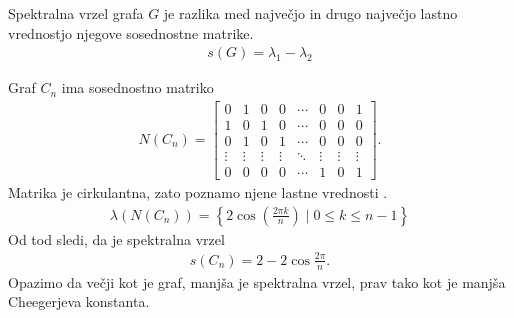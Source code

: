 \begin{definicija}
    Spektralna vrzel grafa \(G\) je razlika med največjo in drugo največjo lastno vrednostjo njegove sosednostne matrike.
    \begin{align*}
        s(G) = \lambda_1 - \lambda_2
    \end{align*}
\end{definicija}
\begin{primer}[Cikli]
    Graf \(C_n\) ima sosednostno matriko
    \begin{align*}
        N(C_n) = \begin{bmatrix}
                     0      & 1      & 0      & 0      & \cdots & 0      & 0      & 1      \\
                     1      & 0      & 1      & 0      & \cdots & 0      & 0      & 0      \\
                     0      & 1      & 0      & 1      & \cdots & 0      & 0      & 0      \\
                     \vdots & \vdots & \vdots & \vdots & \ddots & \vdots & \vdots & \vdots \\
                     0      & 0      & 0      & 0      & \cdots & 1      & 0      & 1
                 \end{bmatrix}.
    \end{align*}
    Matrika je cirkulantna, zato poznamo njene lastne vrednosti \cite{circulant}.
    \begin{align*}
        \lambda(N(C_n)) = \left\{ 2 \cos\left(\frac{2\pi k}{n}\right) \mid 0 \leq k \leq n-1\right\}
    \end{align*}
    Od tod sledi, da je spektralna vrzel
    \begin{align*}
        s(C_n) = 2 - 2\cos\frac{2\pi}{n}.
    \end{align*}
    Opazimo da večji kot je graf, manjša je spektralna vrzel, prav tako kot je manjša Cheegerjeva konstanta.
\end{primer}
